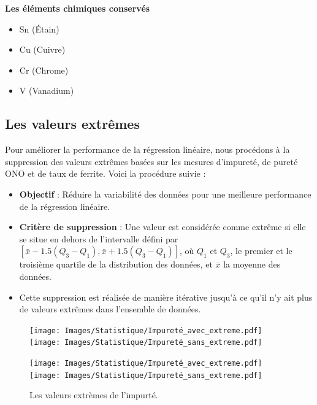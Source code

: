 \documentclass[12pt]{article}
\begin{document}
\textbf{Les éléments chimiques conservés}
\begin{itemize}
\item Sn (Étain) 
\item Cu (Cuivre)
\item Cr (Chrome) 
\item V (Vanadium)
\end{itemize}






\subsection{Les valeurs extrêmes}



Pour améliorer la performance de la régression linéaire, nous procédons à la suppression des valeurs extrêmes basées sur les mesures d'impureté, de pureté ONO et de taux de ferrite. Voici la procédure suivie :

\begin{itemize}
    \item \textbf{Objectif} : Réduire la variabilité des données pour une meilleure performance de la régression linéaire.
    \item \textbf{Critère de suppression } : Une valeur est considérée comme extrême si elle se situe en dehors de l'intervalle défini par $[\bar{x} - 1.5(Q_3 - Q_1), \bar{x} + 1.5(Q_3 - Q_1)]$, où $Q_1$ et $Q_3$, le premier et le troisième quartile de la distribution des données, et $\bar{x}$ la moyenne des données.
    \item Cette suppression est réalisée de manière itérative jusqu'à ce qu'il n'y ait plus de valeurs extrêmes dans l'ensemble de données.
\end{itemize}





\begin{figure}[H]
    \texttt{[image: Images/Statistique/Impureté\_avec\_extreme.pdf]}
    \texttt{[image: Images/Statistique/Impureté\_sans\_extreme.pdf]}
\end{figure}


\begin{figure}[H]
    \centering
    \begin{adjustbox}{width=1.3\textwidth,center}
        \texttt{[image: Images/Statistique/Impureté\_avec\_extreme.pdf]}
        \texttt{[image: Images/Statistique/Impureté\_sans\_extreme.pdf]}
    \end{adjustbox}
    \caption{Les valeurs extrèmes de l'impurté.}
    \label{fig:Extrem}
\end{figure}
\end{document}
